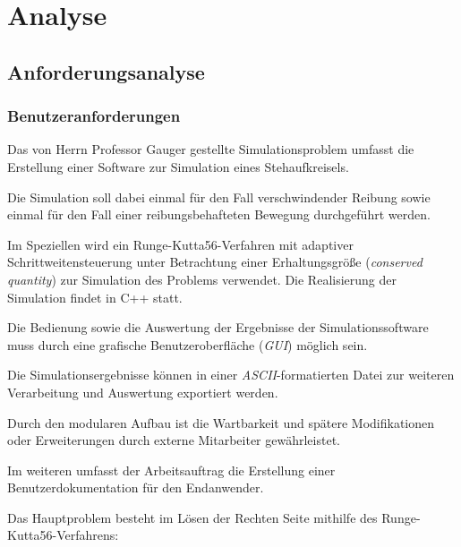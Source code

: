 \chapter{Analyse}
\label{ch:2}

\section{Anforderungsanalyse}
\label{sec:2.1}

\subsection{Benutzeranforderungen}

{Das von Herrn Professor Gauger gestellte Simulationsproblem umfasst die Erstellung einer Software zur Simulation eines Stehaufkreisels.

Die Simulation soll dabei einmal f\"ur den Fall verschwindender Reibung sowie einmal für den Fall einer reibungsbehafteten Bewegung durchgef\"uhrt werden. 

Im Speziellen wird ein Runge-Kutta56-Verfahren mit adaptiver Schrittweitensteuerung unter Betrachtung einer Erhaltungsgröße (\textit{conserved quantity}) zur Simulation des Problems verwendet. Die Realisierung der Simulation findet in C++ statt.

Die Bedienung sowie die Auswertung der Ergebnisse der Simulationssoftware muss durch eine grafische Benutzeroberfl\"ache (\textit{GUI}) m\"oglich sein.

Die Simulationsergebnisse k\"onnen in einer \textit{ASCII}-formatierten Datei zur weiteren Verarbeitung und Auswertung exportiert werden.


Durch den modularen Aufbau ist die Wartbarkeit und sp\"atere Modifikationen oder Erweiterungen durch externe Mitarbeiter gew\"ahrleistet. 


Im weiteren umfasst der Arbeitsauftrag die Erstellung einer Benutzerdokumentation f\"ur den Endanwender. 
\em 

Das Hauptproblem besteht im L\"osen der Rechten Seite mithilfe des Runge-Kutta56-Verfahrens:

}
